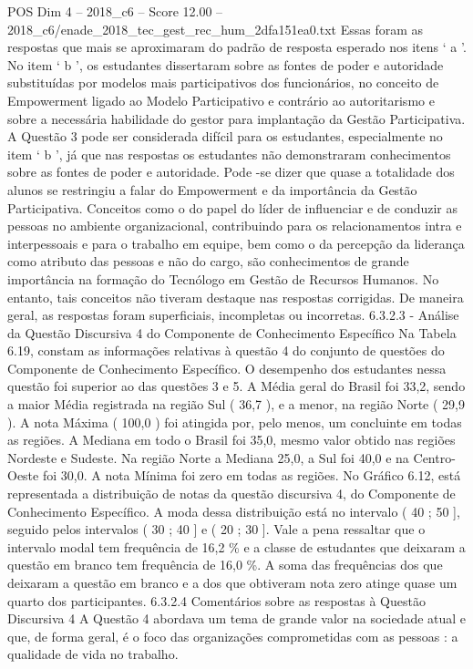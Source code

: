 \begin{textsample}{POS Dim 4 – 2018\_c6 – Score 12.00 – 2018\_c6/enade\_2018\_tec\_gest\_rec\_hum\_2dfa151ea0.txt}
Essas foram as respostas que mais se aproximaram do padrão de resposta esperado nos itens ‘ a ’.
No item ‘ b ’, os estudantes dissertaram sobre as fontes de poder e autoridade substituídas por modelos mais participativos dos funcionários, no conceito de Empowerment ligado ao Modelo Participativo e contrário ao autoritarismo e sobre a necessária habilidade do gestor para implantação da Gestão Participativa.
A Questão 3 pode ser considerada difícil para os estudantes, especialmente no item ‘ b ’, já que nas respostas os estudantes não demonstraram conhecimentos sobre as fontes de poder e autoridade.
Pode -se dizer que quase a totalidade dos alunos se restringiu a falar do Empowerment e da importância da Gestão Participativa.
Conceitos como o do papel do líder de influenciar e de conduzir as pessoas no ambiente organizacional, contribuindo para os relacionamentos intra e interpessoais e para o trabalho em equipe, bem como o da percepção da liderança como atributo das pessoas e não do cargo, são conhecimentos de grande importância na formação do Tecnólogo em Gestão de Recursos Humanos.
No entanto, tais conceitos não tiveram destaque nas respostas corrigidas.
De maneira geral, as respostas foram superficiais, incompletas ou incorretas. 6.3.2.3 - Análise da Questão Discursiva 4 do Componente de Conhecimento Específico Na Tabela 6.19, constam as informações relativas à questão 4 do conjunto de questões do Componente de Conhecimento Específico.
O desempenho dos estudantes nessa questão foi superior ao das questões 3 e 5.
A Média geral do Brasil foi 33,2, sendo a maior Média registrada na região Sul ( 36,7 ), e a menor, na região Norte ( 29,9 ).
A nota Máxima ( 100,0 ) foi atingida por, pelo menos, um concluinte em todas as regiões.
A Mediana em todo o Brasil foi 35,0, mesmo valor obtido nas regiões Nordeste e Sudeste.
Na região Norte a Mediana 25,0, a Sul foi 40,0 e na Centro-Oeste foi 30,0.
A nota Mínima foi zero em todas as regiões.
No Gráfico 6.12, está representada a distribuição de notas da questão discursiva 4, do Componente de Conhecimento Específico.
A moda dessa distribuição está no intervalo ( 40 ; 50 ], seguido pelos intervalos ( 30 ; 40 ] e ( 20 ; 30 ].
Vale a pena ressaltar que o intervalo modal tem frequência de 16,2 \% e a classe de estudantes que deixaram a questão em branco tem frequência de 16,0 \%.
A soma das frequências dos que deixaram a questão em branco e a dos que obtiveram nota zero atinge quase um quarto dos participantes. 6.3.2.4 Comentários sobre as respostas à Questão Discursiva 4 A Questão 4 abordava um tema de grande valor na sociedade atual e que, de forma geral, é o foco das organizações comprometidas com as pessoas : a qualidade de vida no trabalho.

\end{textsample}
